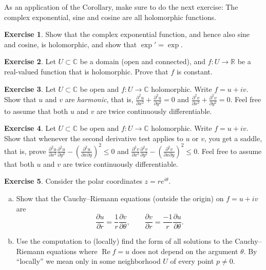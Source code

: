 \documentclass[12pt,openany]{book}
\renewcommand{\Re}{\operatorname{Re}}
\newcommand{\C}{{\mathbb{C}}}
\newcommand{\R}{{\mathbb{R}}}
\newcommand{\myindex}[1]{#1\index{#1}}
\newcommand{\myquote}[1]{``#1''}
\theoremstyle{plain}
\theoremstyle{remark}
\theoremstyle{definition}
\newenvironment{exbox}{%
    \def\FrameCommand{\vrule width 1pt \relax\hspace{10pt}}%
    \MakeFramed{\advance\hsize-\width\FrameRestore}%
}{%
    \endMakeFramed
}
\newenvironment{exparts}{%
    \leavevmode\begin{enumerate}[a),noitemsep,topsep=0pt,parsep=0pt,partopsep=0pt]
}{%
    \end{enumerate}
}
\theoremstyle{exercise}
\newtheorem{exercise}{Exercise}[section]
\theoremstyle{example}
\begin{document}
As an application of the Corollary,
make sure to do the next exercise: The complex exponential,
sine and cosine are all holomorphic functions.

\begin{exbox}
\begin{exercise} \label{exercise:exponentialholomorphic}
Show that the complex exponential function, and hence also sine and cosine,
is holomorphic, and show that $\exp' = \exp$.
\end{exercise}

\begin{exercise}
Let $U \subset \C$ be a domain (open and connected),
and $f \colon U \to \R$ be a real-valued function that is holomorphic.
Prove that $f$ is constant.
\end{exercise}

\begin{exercise}
Let $U \subset \C$ be open and $f \colon U \to \C$ holomorphic.
Write $f = u+iv$.  Show that $u$ and $v$ are \emph{\myindex{harmonic}},
that is,
$\frac{\partial^2 u}{\partial x^2} +  \frac{\partial^2 u}{\partial y^2} = 0$
and
$\frac{\partial^2 v}{\partial x^2} +  \frac{\partial^2 v}{\partial y^2} = 0$.
Feel free to assume that both $u$ and $v$ are twice continuously
differentiable.
\end{exercise}

\begin{exercise}
Let $U \subset \C$ be open and $f \colon U \to \C$ holomorphic.
Write $f = u+iv$.  Show that whenever the second derivative test applies 
to $u$ or $v$, you get a saddle, that is, prove
$\frac{\partial^2 u}{\partial x^2} \frac{\partial^2 u}{\partial y^2}
-{\left(\frac{\partial^2 u}{\partial x \partial y}\right)}^2 \leq 0$
and
$\frac{\partial^2 v}{\partial x^2} \frac{\partial^2 v}{\partial y^2}
-{\left(\frac{\partial^2 v}{\partial x \partial y}\right)}^2 \leq 0$.
Feel free to assume that both $u$ and $v$ are twice continuously
differentiable.
\end{exercise}

\begin{exercise}
Consider the polar coordinates $z = r e^{i\theta}$.
\begin{exparts}
\item
Show that 
the Cauchy--Riemann equations (outside the origin) on $f=u+iv$ are
\begin{equation*}
\frac{\partial u}{\partial r} = \frac{1}{r} \frac{\partial v}{\partial \theta},
\qquad
\frac{\partial v}{\partial r} = \frac{-1}{r} \frac{\partial u}{\partial \theta}.
\end{equation*}
\item
Use the computation to (locally) find the form of all solutions to 
the Cauchy--Riemann equations where $\Re f = u$ does not depend on the
argument $\theta$.  By \myquote{locally} we mean only in some neighborhood $U$ of
every point $p \not= 0$.
\end{exparts}
\end{exercise}
\end{exbox}
\end{document}
